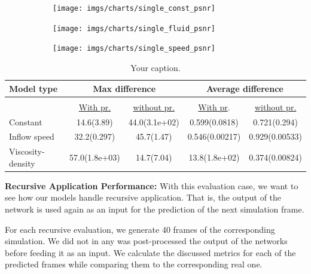 \documentclass{llncs}
\begin{document}
\begin{figure}
  \begin{subfigure}{.3\textwidth}
    \centering
    \texttt{[image: imgs/charts/single\_const\_psnr]}
  \end{subfigure}
  \begin{subfigure}{.3\textwidth}
    \centering
    \texttt{[image: imgs/charts/single\_fluid\_psnr]}
  \end{subfigure}
  \begin{subfigure}{.3\textwidth}
    \centering
    \texttt{[image: imgs/charts/single\_speed\_psnr]}
  \end{subfigure}

  \caption{}\label{fig:single_psnr}
\end{figure}

\begin{table}
  \begin{center}
    \begin{tabular}{lcc|cc}

      \textbf{Model type} & \multicolumn{2}{c|}{\textbf{Max difference}}  &  \multicolumn{2}{c}{\textbf{Average difference}}\\
      \hline 
      \multicolumn{3}{c|}{}&&\\
                 & \underline{With pr.} & \underline{without pr.}  &  \underline{With pr}.& \underline{without pr.}\\
      
      Constant          &  14.6(3.89)&44.0(3.1e+02)&0.599(0.0818)&0.721(0.294)  \\

      Inflow speed      &  32.2(0.297)&45.7(1.47)&0.546(0.00217)&0.929(0.00533) \\

      Viscosity-density &  57.0(1.8e+03)&14.7(7.04)&13.8(1.8e+02)&0.374(0.00824) \\
    \end{tabular}
  \end{center}
  \caption{Your caption.}\label{tab:single}
\end{table}

\noindent\textbf{Recursive Application Performance:}
With this evaluation case, we want to see how our models handle recursive application. That is, the output of the network is used again as an input for the prediction of the next simulation frame.

For each recursive evaluation, we generate 40 frames of the corresponding simulation. We did not in any was post-processed the output of the networks before feeding it as an input. We calculate the discussed metrics for each of the predicted frames while comparing them to the corresponding real one.
\end{document}
